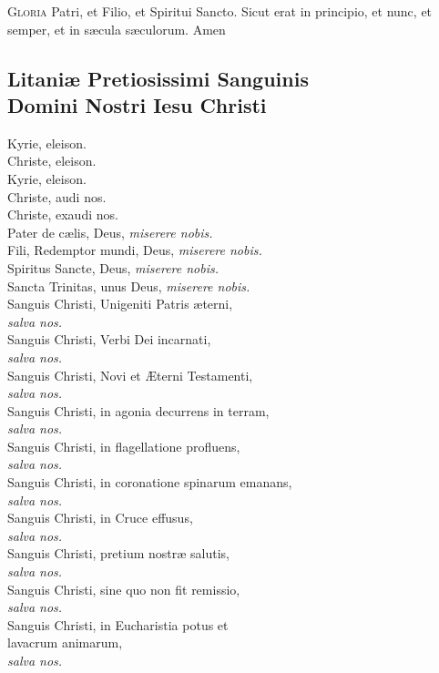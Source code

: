 \documentclass[9pt, twoside]{book}
\begin{document}
\textsc{Gloria} Patri, et Filio, et Spiritui Sancto. Sicut erat in principio, et nunc, et semper, et in sæcula sæculorum. Amen

\subsection{Litaniæ Pretiosissimi Sanguinis \\ Domini Nostri Iesu Christi}

{\RaggedRight
Kyrie, eleison.\\
Christe, eleison.\\
Kyrie, eleison.\\
Christe, audi nos.\\
Christe, exaudi nos.\\
Pater de cælis, Deus, \textit{miserere nobis.}\\
Fili, Redemptor mundi, Deus, \textit{miserere nobis.}\\
Spiritus Sancte, Deus, \textit{miserere nobis.}\\
Sancta Trinitas, unus Deus, \textit{miserere nobis.}\\
Sanguis Christi, Unigeniti Patris æterni,\\\tab \textit{salva nos.}\\
Sanguis Christi, Verbi Dei incarnati,\\\tab \textit{salva nos.}\\
Sanguis Christi, Novi et Æterni Testamenti,\\\tab \textit{salva nos.}\\
Sanguis Christi, in agonia decurrens in terram,\\\tab \textit{salva nos.}\\
Sanguis Christi, in flagellatione profluens,\\\tab \textit{salva nos.}\\
Sanguis Christi, in coronatione spinarum emanans,\\\tab \textit{salva nos.}\\
Sanguis Christi, in Cruce effusus,\\\tab \textit{salva nos.}\\
Sanguis Christi, pretium nostræ salutis,\\\tab \textit{salva nos.}\\
Sanguis Christi, sine quo non fit remissio,\\\tab \textit{salva nos.}\\
Sanguis Christi, in Eucharistia potus et \\ lavacrum animarum,\\\tab \textit{salva nos.}\\
}
\end{document}
